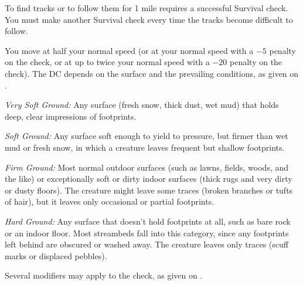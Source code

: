 {To find tracks or to follow them for 1 mile requires a successful Survival check. You must make another Survival check every time the tracks become difficult to follow.

You move at half your normal speed (or at your normal speed with a $-5$ penalty on the check, or at up to twice your normal speed with a $-20$ penalty on the check). The DC depends on the surface and the prevailing conditions, as given on .



\textit{Very Soft Ground:} Any surface (fresh snow, thick dust, wet mud) that holds deep, clear impressions of footprints.

\textit{Soft Ground:} Any surface soft enough to yield to pressure, but firmer than wet mud or fresh snow, in which a creature leaves frequent but shallow footprints.

\textit{Firm Ground:} Most normal outdoor surfaces (such as lawns, fields, woods, and the like) or exceptionally soft or dirty indoor surfaces (thick rugs and very dirty or dusty floors). The creature might leave some traces (broken branches or tufts of hair), but it leaves only occasional or partial footprints.

\textit{Hard Ground:} Any surface that doesn't hold footprints at all, such as bare rock or an indoor floor. Most streambeds fall into this category, since any footprints left behind are obscured or washed away. The creature leaves only traces (scuff marks or displaced pebbles).

Several modifiers may apply to the  check, as given on .

}
